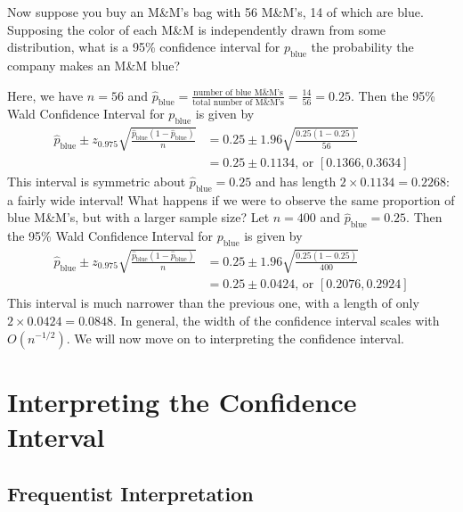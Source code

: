 \documentclass[twoside]{article}
\theoremstyle{definition}
\begin{document}
Now suppose you buy an M\&M's bag with 56 M\&M's, 14 of which are blue. Supposing the color of each M\&M is independently drawn from some distribution, what is a 95\% confidence interval for $p_{\text{blue}}$ the probability the company makes an M\&M blue?

Here, we have $n = 56$ and $\widehat{p}_{\text{blue}} = \frac{\text{number of blue M\&M's}}{\text{total number of M\&M's}} = \frac{14}{56} = 0.25$. Then the 95\% Wald Confidence Interval for $p_{\text{blue}}$ is given by
\begin{align*}
   \widehat{p}_{\text{blue}} \pm z_{0.975} \sqrt{\frac{\widehat{p}_{\text{blue}}(1-\widehat{p}_{\text{blue}})}{n}} &= 0.25 \pm 1.96 \sqrt{\frac{0.25\left(1-0.25\right)}{56}} \\
   &= 0.25 \pm 0.1134 \text{, or } [0.1366, 0.3634]
\end{align*}
This interval is symmetric about $\widehat{p}_{\text{blue}} = 0.25$ and has length $2 \times 0.1134 = 0.2268$: a fairly wide interval! What happens if we were to observe the same proportion of blue M\&M's, but with a larger sample size? Let $n = 400$ and $\widehat{p}_{\text{blue}} = 0.25$. Then the 95\% Wald Confidence Interval for $p_{\text{blue}}$ is given by
\begin{align*}
   \widehat{p}_{\text{blue}} \pm z_{0.975} \sqrt{\frac{\widehat{p}_{\text{blue}}(1-\widehat{p}_{\text{blue}})}{n}} &= 0.25 \pm 1.96 \sqrt{\frac{0.25\left(1-0.25\right)}{400}} \\
   &= 0.25 \pm 0.0424 \text{, or } [0.2076, 0.2924]
\end{align*}
This interval is much narrower than the previous one, with a length of only $2 \times 0.0424 = 0.0848$. In general, the width of the confidence interval scales with $O(n^{-1/2})$. We will now move on to interpreting the confidence interval.

\section{Interpreting the Confidence Interval}

\subsection{Frequentist Interpretation}
\end{document}
